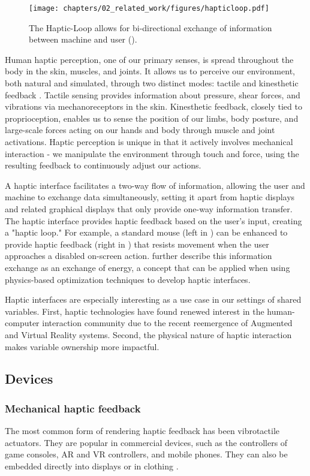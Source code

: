 \begin{figure}[h]
 \center
  \texttt{[image: chapters/02\_related\_work/figures/hapticloop.pdf]}
  \caption{The Haptic-Loop allows for bi-directional exchange of information between machine and user (\citet{hayward2004haptic}).}
  \label{fig:haptic-loop} 
\end{figure}
Human haptic perception, one of our primary senses, is spread throughout the body in the skin, muscles, and joints. It allows us to perceive our environment, both natural and simulated, through two distinct modes: tactile and kinesthetic feedback \cite{Culbertson18}. Tactile sensing provides information about pressure, shear forces, and vibrations via mechanoreceptors in the skin. Kinesthetic feedback, closely tied to proprioception, enables us to sense the position of our limbs, body posture, and large-scale forces acting on our hands and body through muscle and joint activations. Haptic perception is unique in that it actively involves mechanical interaction - we manipulate the environment through touch and force, using the resulting feedback to continuously adjust our actions.

A haptic interface facilitates a two-way flow of information, allowing the user and machine to exchange data simultaneously, setting it apart from haptic displays and related graphical displays that only provide one-way information transfer. The haptic interface provides haptic feedback based on the user's input, creating a "haptic loop." For example, a standard mouse (left in ) can be enhanced to provide haptic feedback (right in ) that resists movement when the user approaches a disabled on-screen action. \citet{hayward2004haptic} further describe this information exchange as an exchange of energy, a concept that can be applied when using physics-based optimization techniques to develop haptic interfaces.

Haptic interfaces are especially interesting as a use case in our settings of shared variables. First, haptic technologies have found renewed interest in the human-computer interaction community due to the recent reemergence of Augmented and Virtual Reality systems. Second, the physical nature of haptic interaction makes variable ownership more impactful.

\subsection{Devices}
\subsubsection{Mechanical haptic feedback}
The most common form of rendering haptic feedback has been vibrotactile actuators.
They are popular in commercial devices, such as the controllers of game consoles, AR and VR controllers, and mobile phones. They can also be embedded directly into displays \cite{Wellman1995} or in clothing \cite{Cybertouch, Gloveone}.

